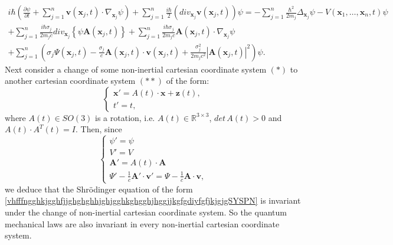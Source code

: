 \documentclass{article}
\theoremstyle{definition}
\theoremstyle{remark}
\renewcommand{\vec}[1]{\mathbf{#1}}
\newcommand{\R}{\mathbb{R}}
\newcommand{\er}{\eqref}
\newcommand{\R}{{\mathbb{R}}}
\newcommand{\er}{\eqref}
\begin{document}
%
%
%
\begin{multline}\label{vhfffngghkjgghfjjghghghhjghjgghkghgghjhggjjkgfgdiyfgfjkjgjgSYSPN}
i\hbar\left(\frac{\partial\psi}{\partial t}+\sum_{j=1}^{n}\vec
v(\vec x_j,t)\cdot\nabla_{\vec
x_j}\psi\right)+\sum_{j=1}^{n}\frac{i\hbar}{2}\left(div_{\vec
x_j}\vec v(\vec x_j,t)\right)\psi=
-\sum_{j=1}^{n}\frac{\hbar^2}{2m_j}\Delta_{\vec x_j}\psi-V\left(\vec
x_1,\ldots,\vec x_n,t\right)\psi\\+\sum_{j=1}^{n}\frac{
i\hbar\sigma_j}{2m_jc}div_{\vec x_j}\left\{\psi\vec A(\vec
x_j,t)\right\}+\sum_{j=1}^{n}\frac{ i\hbar\sigma_j}{2m_jc}\vec
A(\vec x_j,t)\cdot\nabla_{\vec
x_j}\psi\\+\sum_{j=1}^{n}\left(\sigma_j\Psi(\vec
x_j,t)-\frac{\sigma_j}{c}\vec A(\vec x_j,t)\cdot\vec v(\vec
x_j,t)+\frac{\sigma^2_j}{2m_jc^2}\left|\vec A(\vec
x_j,t)\right|^2\right)\psi.
\end{multline}
Next consider a change of some non-inertial cartesian coordinate
system $(*)$ to another cartesian coordinate system $(**)$ of the
form:
\begin{equation}\label{noninchgravortbstrghgggSYSPN}
\begin{cases}
\vec x'=A(t)\cdot\vec x+\vec z(t),\\
t'=t,
\end{cases}
\end{equation}
where $A(t)\in SO(3)$ is a rotation, i.e. $A(t)\in \R^{3\times 3}$,
$det\, A(t)>0$ and $A(t)\cdot A^T(t)=I$. Then, since
\begin{equation}\label{vyfgjhgjhvhgghSYSPN}
\begin{cases}
\psi'=\psi
\\
V'=V
\\
\vec A'=A(t)\cdot\vec A
\\
\Psi'-\frac{1}{c}\vec A'\cdot\vec v'=\Psi-\frac{1}{c}\vec A\cdot\vec
v,
\end{cases}
\end{equation}
we deduce that  the Shr\"{o}dinger equation of the form
\er{vhfffngghkjgghfjjghghghhjghjgghkghgghjhggjjkgfgdiyfgfjkjgjgSYSPN}
is invariant under the change of non-inertial cartesian coordinate
system. So the quantum mechanical laws are also invariant in every
non-inertial cartesian coordinate system.
\end{document}
